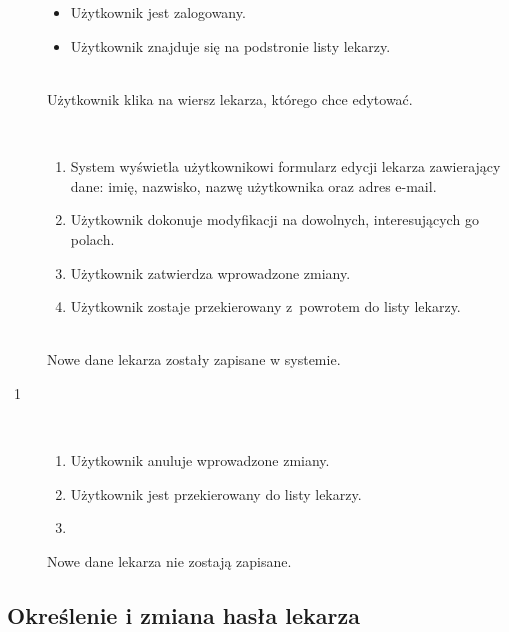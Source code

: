 \documentclass[11pt]{aghdpl}
\begin{document}
	\begin{description}
		\item[\useCaseAktor] \hfill \\
			\useCaseUzytkownik
		\item[\useCaseWarPocz] \hfill \\
			\begin{itemize}
				\item Użytkownik jest zalogowany.
				\item Użytkownik znajduje się na podstronie listy lekarzy.
			\end{itemize}
		\item[\useCaseZdarzInicj] \hfill \\
			Użytkownik klika na wiersz lekarza, którego chce edytować.
		\item[\useCaseScenBaz] \hfill \\ 
			\begin{enumerate}
				\item System wyświetla użytkownikowi formularz edycji lekarza zawierający dane: imię, nazwisko, nazwę użytkownika oraz adres e-mail.
				\item Użytkownik dokonuje modyfikacji na dowolnych, interesujących go polach.
				\item Użytkownik zatwierdza wprowadzone zmiany.
				\item Użytkownik zostaje przekierowany z~powrotem do listy lekarzy.
			\end{enumerate}
		\item[\useCaseWarKonc] \hfill \\ 
			Nowe dane lekarza zostały zapisane w systemie.
		\item[\useCaseWyjatek~1] \hfill \\
			\begin{enumerate}[label=3a\arabic*.]
				\item Użytkownik anuluje wprowadzone zmiany.
				\item Użytkownik jest przekierowany do listy lekarzy.
				\item \useCaseEnd
			\end{enumerate}
			Nowe dane lekarza nie zostają zapisane.
	\end{description}

\subsection{Określenie i zmiana hasła lekarza}
\end{document}
